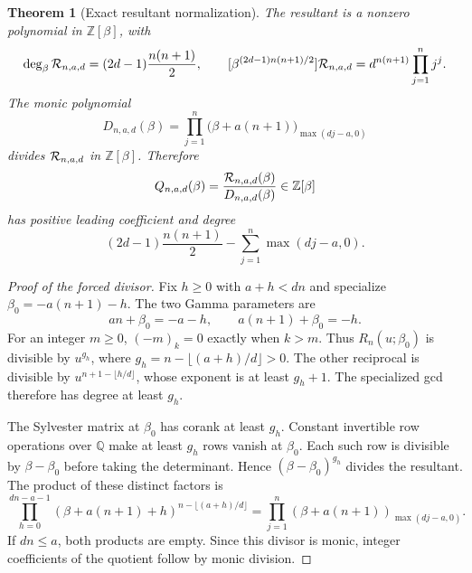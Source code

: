 \documentclass[11pt]{article}
\newtheorem{theorem}{Theorem}
\newcommand{\Q}{\mathbb Q}
\newcommand{\Z}{\mathbb Z}
\begin{document}
\begin{theorem}[Exact resultant normalization]\label{thm:normalization}
The resultant is a nonzero polynomial in $\Z[\beta]$, with
\[
 \deg_\beta{\cal R}_{n,a,d}=(2d-1)\frac{n(n+1)}2,\qquad
 [\beta^{(2d-1)n(n+1)/2}]{\cal R}_{n,a,d}
 =d^{n(n+1)}\prod_{j=1}^n j^j .
\]
The monic polynomial
\[
 D_{n,a,d}(\beta)
 =\prod_{j=1}^n
    \bigl(\beta+a(n+1)\bigr)_{\max(dj-a,0)}
\]
divides $ {\cal R}_{n,a,d}$ in $\Z[\beta]$. Therefore
\[
 Q_{n,a,d}(\beta)=\frac{{\cal R}_{n,a,d}(\beta)}
                       {D_{n,a,d}(\beta)}
 \in\Z[\beta]
\]
has positive leading coefficient and degree
\[
 (2d-1)\frac{n(n+1)}2-\sum_{j=1}^n\max(dj-a,0).
\]
\end{theorem}
\begin{proof}[Proof of the forced divisor]
Fix $h\ge0$ with $a+h<dn$ and specialize
$\beta_0=-a(n+1)-h$. The two Gamma parameters are
\[
 an+\beta_0=-a-h,\qquad a(n+1)+\beta_0=-h.
\]
For an integer $m\ge0$, $(-m)_k=0$ exactly when $k>m$.
Thus $R_n(u;\beta_0)$ is divisible by
$u^{g_h}$, where $g_h=n-\lfloor(a+h)/d\rfloor>0$.
The other reciprocal is divisible by
$u^{n+1-\lfloor h/d\rfloor}$, whose exponent is at least $g_h+1$.
The specialized gcd therefore has degree at least $g_h$.

The Sylvester matrix at $\beta_0$ has corank at least $g_h$.
Constant invertible row operations over $\Q$ make at least $g_h$
rows vanish at $\beta_0$. Each such row is divisible by
$\beta-\beta_0$ before taking the determinant. Hence
$(\beta-\beta_0)^{g_h}$ divides the resultant.
The product of these distinct factors is
\[
 \prod_{h=0}^{dn-a-1}
 (\beta+a(n+1)+h)^{n-\lfloor(a+h)/d\rfloor}
 =
 \prod_{j=1}^n(\beta+a(n+1))_{\max(dj-a,0)} .
\]
If $dn\le a$, both products are empty. Since this divisor is monic,
integer coefficients of the quotient follow by monic division.
\end{proof}
\end{document}
